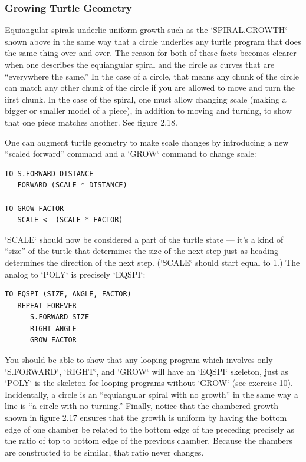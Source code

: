 \documentclass{book}
\begin{document}
\subsubsection{Growing Turtle Geometry}

Equiangular spirals underlie uniform growth such as the \textsc{`SPIRAL.GROWTH`}
shown above in the same way that a circle underlies any turtle program
that does the same thing over and over. The reason for both of these
facts becomes clearer when one describes the equiangular spiral and the
circle as curves that are ``everywhere the same.'' In the case of a circle,
that means any chunk of the circle can match any other chunk of the
circle if you are allowed to move and turn the iirst chunk. In the case
of the spiral, one must allow changing scale (making a bigger or smaller
model of a piece), in addition to moving and turning, to show that one
piece matches another. See figure 2.18.

One can augment turtle geometry to make scale changes by introducing a new ``scaled forward'' command and a \textsc{`GROW`} command to change
scale:

\begin{verbatim}
TO S.FORWARD DISTANCE
   FORWARD (SCALE * DISTANCE)
 
TO GROW FACTOR
   SCALE <- (SCALE * FACTOR)
\end{verbatim}
\noindent \textsc{`SCALE`} should now be considered a part of the turtle state --- it's a kind
of ``size'' of the turtle that determines the size of the next step just as
heading determines the direction of the next step. (\textsc{`SCALE`} should start
equal to 1.)
The analog to \textsc{`POLY`} is precisely \textsc{`EQSPI`}:

\begin{verbatim}
TO EQSPI (SIZE, ANGLE, FACTOR)
   REPEAT FOREVER
      S.FORWARD SIZE
      RIGHT ANGLE
      GROW FACTOR
\end{verbatim}
You should be able to show that any looping program which involves
only \textsc{`S.FORWARD`}, \textsc{`RIGHT`}, and \textsc{`GROW`} will have an \textsc{`EQSPI`} skeleton, just as
\textsc{`POLY`} is the skeleton for looping programs without \textsc{`GROW`} (see exercise
10). Incidentally, a circle is an ``equiangular spiral with no growth'' in
the same way a line is ``a circle with no turning.'' Finally, notice that
the chambered growth shown in figure 2.17 ensures that the growth is
uniform by having the bottom edge of one chamber be related to the
bottom edge of the preceding precisely as the ratio of top to bottom
edge of the previous chamber. Because the chambers are constructed to
be similar, that ratio never changes.
\end{document}
